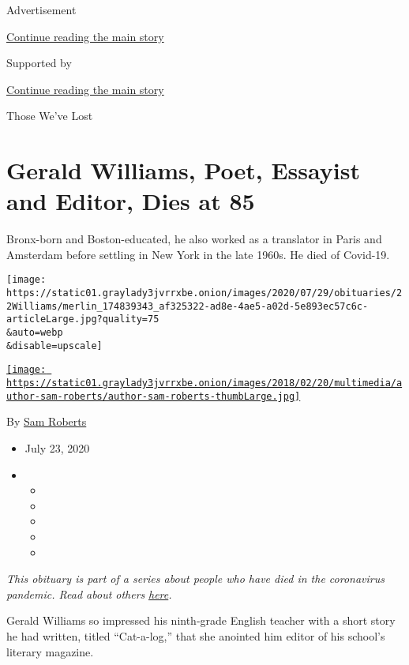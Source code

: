Advertisement

\protect\hyperlink{after-top}{Continue reading the main story}

Supported by

\protect\hyperlink{after-sponsor}{Continue reading the main story}

Those We've Lost

\hypertarget{gerald-williams-poet-essayist-and-editor-dies-at-85}{%
\section{Gerald Williams, Poet, Essayist and Editor, Dies at
85}\label{gerald-williams-poet-essayist-and-editor-dies-at-85}}

Bronx-born and Boston-educated, he also worked as a translator in Paris
and Amsterdam before settling in New York in the late 1960s. He died of
Covid-19.

\texttt{[image: https://static01.graylady3jvrrxbe.onion/images/2020/07/29/obituaries/22Williams/merlin\_174839343\_af325322-ad8e-4ae5-a02d-5e893ec57c6c-articleLarge.jpg?quality=75\\\&auto=webp\\\&disable=upscale]}

\href{https://www.nytimes3xbfgragh.onion/by/sam-roberts}{\texttt{[image: https://static01.graylady3jvrrxbe.onion/images/2018/02/20/multimedia/author-sam-roberts/author-sam-roberts-thumbLarge.jpg]}}

By \href{https://www.nytimes3xbfgragh.onion/by/sam-roberts}{Sam Roberts}

\begin{itemize}
\item
  July 23, 2020
\item
  \begin{itemize}
  \item
  \item
  \item
  \item
  \item
  \end{itemize}
\end{itemize}

\emph{This obituary is part of a series about people who have died in
the coronavirus pandemic. Read about others}
\href{https://www.nytimes3xbfgragh.onion/interactive/2020/obituaries/people-died-coronavirus-obituaries.html}{\emph{here}}\emph{.}

Gerald Williams so impressed his ninth-grade English teacher with a
short story he had written, titled ``Cat-a-log,'' that she anointed him
editor of his school's literary magazine.

